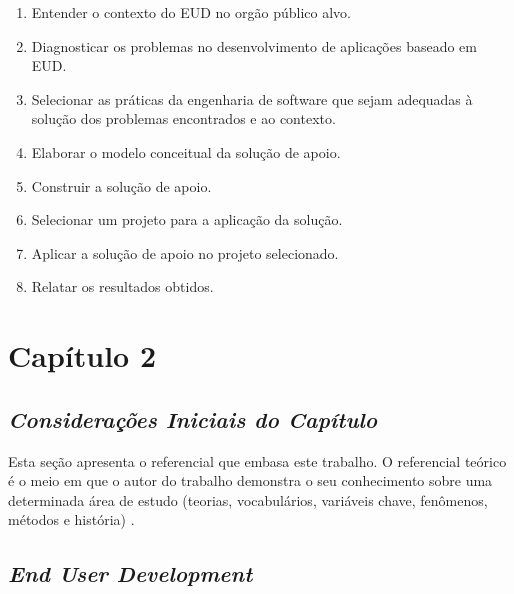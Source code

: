 \begin{enumerate}
\item Entender o contexto do EUD no orgão público alvo.
\item Diagnosticar os problemas no desenvolvimento de aplicações baseado em EUD.
\item Selecionar as práticas da engenharia de software que sejam adequadas à solução dos problemas encontrados e ao contexto.
\item Elaborar o modelo conceitual da solução de apoio.
\item Construir a solução de apoio.
\item Selecionar um projeto para a aplicação da solução.
\item Aplicar a solução de apoio no projeto selecionado.
\item Relatar os resultados obtidos.
\end{enumerate}

\chapter[Capítulo 2]{Capítulo 2}

\section{\textit{Considerações Iniciais do Capítulo}}

Esta seção apresenta o referencial que embasa este trabalho. O referencial teórico é o meio em que o autor do trabalho demonstra o seu conhecimento sobre uma determinada área de estudo (teorias, vocabulários, variáveis chave, fenômenos, métodos e história) \cite{randolph2009}.


\section{\textit{End User Development}}

